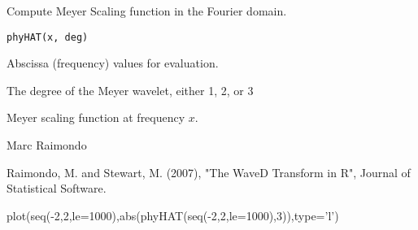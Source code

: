 \documentclass{article}
\begin{document}
\begin{Description}\relax
Compute Meyer Scaling function in the Fourier domain.
\end{Description}
\begin{Usage}
\begin{verbatim}
phyHAT(x, deg)
\end{verbatim}
\end{Usage}
\begin{Arguments}
\begin{ldescription}
\item[\code{x}] Abscissa (frequency) values for  evaluation.
\item[\code{deg}] The degree of the Meyer wavelet, either 1, 2, or 3 
\end{ldescription}
\end{Arguments}
\begin{Value}
Meyer scaling function at frequency $x$.
\end{Value}
\begin{Author}\relax
Marc Raimondo
\end{Author}
\begin{References}\relax
Raimondo, M. and Stewart, M. (2007),
"The WaveD Transform in R", Journal of Statistical Software.
\end{References}
\begin{SeeAlso}\relax
{}
\end{SeeAlso}
\begin{Examples}
\begin{ExampleCode}
plot(seq(-2,2,le=1000),abs(phyHAT(seq(-2,2,le=1000),3)),type='l')

\end{ExampleCode}
\end{Examples}
\end{document}
